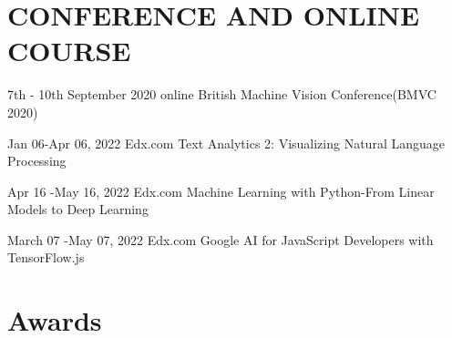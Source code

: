 \documentclass[
	10pt, %
]{FreemanCV}
\begin{document}
\begin{paracol}{2}
\section{CONFERENCE AND ONLINE COURSE}





\jobentry
	{7th - 10th September 2020} %
	{online} %
	{British Machine Vision Conference(BMVC 2020)} %
	{} %
	{} %


\jobentry
	{Jan 06-Apr 06, 2022 } %
	{Edx.com} %
	{Text Analytics 2: Visualizing Natural Language Processing} %
	{} %
	{} %

	
\jobentry
	{Apr 16 -May 16, 2022 } %
	{Edx.com} %
	{Machine Learning with Python-From Linear Models to Deep Learning} %
	{} %
	{} %

\jobentry
	{March 07 -May 07, 2022 } %
	{Edx.com} %
	{Google AI for JavaScript Developers with TensorFlow.js} %
	{} %
	{} %
\section{Awards}






\end{paracol}
\end{document}
